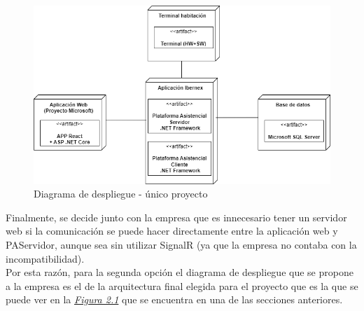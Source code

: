 \begin{figure}[H]
    \centering
    \includegraphics[width=15cm]{Imagenes/Arquitectura-despliegue-3}
    \caption{Diagrama de despliegue - único proyecto}
    \label{fig:despliegue-3}
\end{figure}

Finalmente, se decide junto con la empresa que es innecesario tener un servidor web si la comunicación se puede hacer directamente entre la aplicación web y PAServidor, aunque sea sin utilizar SignalR (ya que la empresa no contaba con la incompatibilidad).\\

Por esta razón, para la segunda opción el diagrama de despliegue que se propone a la empresa es el de la arquitectura final elegida para el proyecto que es la que se puede ver en la \hyperref[fig:despliegue]{\textit{Figura 2.1}} que se encuentra en una de las secciones anteriores.








